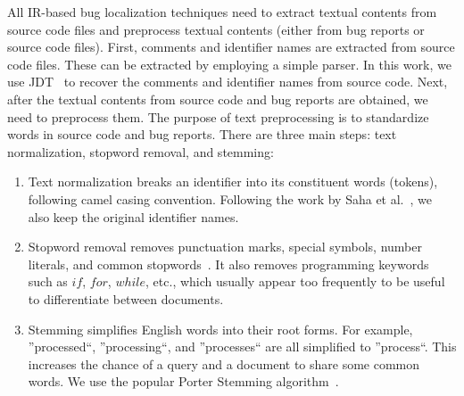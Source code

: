 

All IR-based bug localization techniques need to extract textual contents from source code files and preprocess textual contents (either from bug reports or source code files). First, comments and identifier names are extracted from source code files. These can be extracted by employing a simple parser. In this work, we use JDT~\cite{jdt_link} to recover the comments and identifier names from source code. Next, after the textual contents from source code and bug reports are obtained, we need to preprocess them. The purpose of text preprocessing is to standardize words in source code and bug reports. There are three main steps: text normalization, stopword removal, and stemming:

\begin{enumerate}
	\item Text normalization breaks an identifier into its constituent words (tokens), following camel casing convention. Following the work by Saha et al.~\cite{SahaLKP13}, we also keep the original identifier names.
	\item Stopword removal removes punctuation marks, special symbols, number literals, and common stopwords~\cite{stopword_link}. It also removes programming keywords such as $\mathit{if}$, $\mathit{for}$, $\mathit{while}$, etc., which usually appear too frequently to be useful to differentiate between documents.
	\item Stemming simplifies English words into their root forms. For example, ''processed``, ''processing``, and ''processes`` are all simplified to ''process``. This increases the chance of a query and a document to share some common words. We use the popular Porter Stemming algorithm~\cite{P80}.
\end{enumerate}



